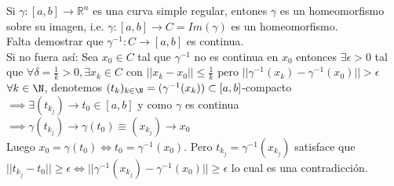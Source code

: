\begin{observación}
Si $\gamma: [a,b] \to \mathbb{R}^n$ es una curva simple regular, entones $\gamma$ es un homeomorfismo sobre su imagen, i.e. $\gamma: [a, b] \to C = Im(\gamma)$ es un homeomorfismo. \\
Falta demostrar que $\gamma^{-1}: C \to [a,b]$ es continua.\\
Si no fuera así: Sea $x_0 \in C$ tal que $\gamma^{-1}$ no es continua en $x_0$ entonces $\exists \epsilon > 0$ tal que $\forall \delta = \frac{1}{k} > 0, \exists x_k \in C$ con $ ||x_k - x_0|| \leq \frac{1}{k}$ pero $||\gamma^{-1}(x_k) - \gamma^{-1}(x_0)|| > \epsilon$ \\
$\forall k \in \N$, denotemos $(t_k)_{k \in \N} = (\gamma^{-1}(x_k)) \subset [a,b]$-compacto $\implies \exists (t_{k_j}) \to t_0 \in [a,b]$ y como $\gamma$ es continua $\implies \gamma(t_{k_j}) \to \gamma(t_0) \equiv (x_{k_j}) \to x_0$ \\
Luego $x_0 = \gamma(t_0) \iff t_0 = \gamma^{-1}(x_0)$. Pero $t_{k_j} = \gamma^{-1}(x_{k_j})$ satisface que $||t_{k_j} - t_0|| \geq \epsilon \iff ||\gamma^{-1}(x_{k_j}) - \gamma^{-1}(x_0)|| \geq \epsilon$ lo cual es una contradicción.
\end{observación}

